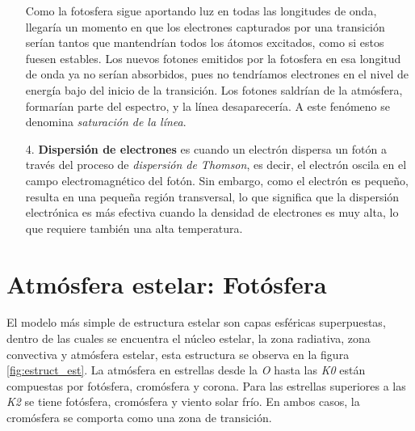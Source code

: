 \documentclass[12pt,oneside,openany,letter]{book}
\begin{document}
\begin{itemize}
    Como la fotosfera sigue aportando luz en todas las longitudes de onda, llegaría un momento en que los electrones capturados por una transición serían tantos que mantendrían todos los átomos excitados, como si estos fuesen estables. Los nuevos fotones emitidos por la fotosfera en esa longitud de onda ya no serían absorbidos, pues no tendríamos electrones en el nivel de energía bajo del inicio de la transición. Los fotones saldrían de la atmósfera, formarían parte del espectro, y la línea desaparecería. A este fenómeno se denomina \textit{saturación de la línea}.

    \item[4.] \textbf{Dispersión de electrones} es cuando un electrón dispersa un fotón a través del proceso de \textit{dispersión de Thomson}, es decir, el electrón oscila en el campo electromagnético del fotón. Sin embargo, como el electrón es pequeño, resulta en una pequeña región transversal, lo que significa que la dispersión electrónica es más efectiva cuando la densidad de electrones es muy alta, lo que requiere también una alta temperatura.
    \end{itemize}
    


\section{Atmósfera estelar: Fotósfera}\label{sec:atm_est}


El modelo más simple de estructura estelar son capas esféricas superpuestas, dentro de las cuales se encuentra el núcleo estelar, la zona radiativa, zona convectiva y atmósfera estelar, esta estructura se observa en la figura \ref{fig:estruct_est}. La atmósfera en estrellas desde la \textit{O} hasta las \textit{K0} están compuestas por fotósfera, cromósfera y corona. Para las estrellas superiores a las \textit{K2} se tiene fotósfera, cromósfera y viento solar frío. En ambos casos, la cromósfera se comporta como una zona de transición.
\end{document}
